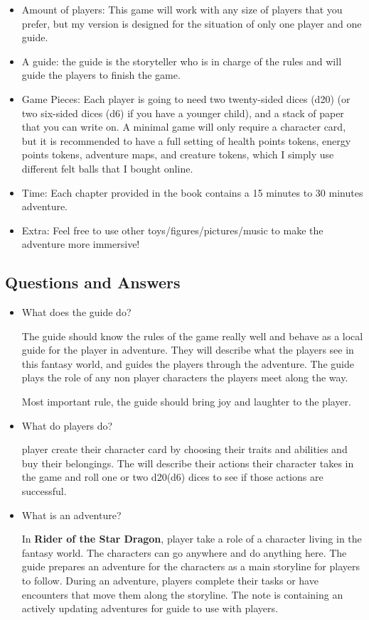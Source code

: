 \documentclass[a4paper,12pt]{article}
\begin{document}
\begin{itemize}
    \item Amount of players: This game will work with any size of players that you prefer, but my version is designed for the situation of only one player and one guide.

\item A guide: the guide is the storyteller who is in charge of the rules and will guide the players to finish the game.

\item Game Pieces: Each player is going to need two twenty-sided dices (d20) (or two six-sided dices (d6) if you have a younger child), and a stack of paper that you can write on. A minimal game will only require a character card, but it is recommended to have a full setting of health points tokens, energy points tokens, adventure maps, and creature tokens, which I simply use different felt balls that I bought online.

\item Time: Each chapter provided in the book contains a 15 minutes to 30 minutes adventure.

\item Extra: Feel free to use other toys/figures/pictures/music to make the adventure more immersive!

\end{itemize}

\subsection{Questions and Answers}
\begin{itemize}
    \item What does the guide do?
    
    The guide should know the rules of the game really well and behave as a local guide for the player in adventure. They will describe what the players see in this fantasy world, and guides the players through the adventure. The guide plays the role of any non player characters the players meet along the way.
    
    Most important rule, the guide should bring joy and laughter to the player.
    
    \item What do players do?
    
    player create their character card by choosing their traits and abilities and buy their belongings. The will describe their actions their character takes in the game and roll one or two d20(d6) dices to see if those actions are successful.
    
    \item What is an adventure?
    
    In \textbf{Rider of the Star Dragon}, player take a role of a character living in the fantasy world. The characters can go anywhere and do anything here. The guide prepares an adventure for the characters as a main storyline for players to follow. During an adventure, players complete their tasks or have encounters that move them along the storyline. The note is containing an actively updating adventures for guide to use with players.
\end{itemize}
\end{document}
